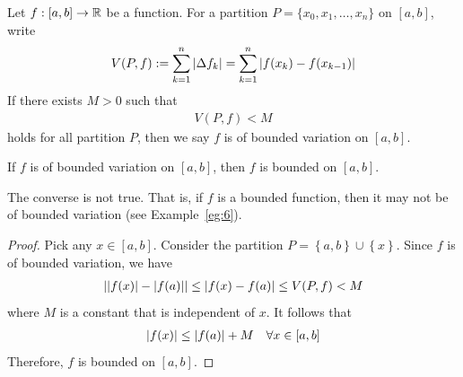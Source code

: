 \documentclass[thmcnt=section, 12pt]{my-elegantbook}
\begin{document}

\begin{definition}
    Let $f: [a, b] \to \mathbb{R}$ be a function. For a partition $P = \{ x_0, x_1, \ldots, x_n \}$ on $[a, b]$, write
    \begin{align*}
        V(P, f) := \sum_{k=1}^n \left\lvert \Delta f_k \right\rvert = \sum_{k=1}^n \left\lvert f(x_k) - f(x_{k-1}) \right\rvert
    \end{align*}
    If there exists $M > 0$ such that
    \begin{align*}
        V(P, f) < M
    \end{align*}
    holds for all partition $P$, then we say $f$ is of bounded variation on $[a, b]$.
\end{definition}


\begin{theorem} \label{thm:35}
    If $f$ is of bounded variation on $[a, b]$, then $f$ is bounded on $[a, b]$.
\end{theorem}

\begin{remark}
    The converse is not true. That is, if $f$ is a bounded function, then it may not be of bounded variation (see Example~\ref{eg:6}).
\end{remark}

\begin{proof}
    Pick any $x \in [a, b]$. Consider the partition $P = \left\{a, b\right\} \cup \left\{x\right\}$. Since $f$ is of bounded variation, we have
    \begin{align*}
        \left\lvert \left\lvert f(x) \right\rvert - \left\lvert f(a) \right\rvert \right\rvert
        \leq \left\lvert f(x) - f(a) \right\rvert
        \leq V(P, f)
        < M
    \end{align*}
    where $M$ is a constant that is independent of $x$. It follows that
    \begin{align*}
        \left\lvert f(x) \right\rvert \leq \left\lvert f(a) \right\rvert + M
        \quad \forall x \in [a, b]
    \end{align*}
    Therefore, $f$ is bounded on $[a, b]$.
\end{proof}
\end{document}
